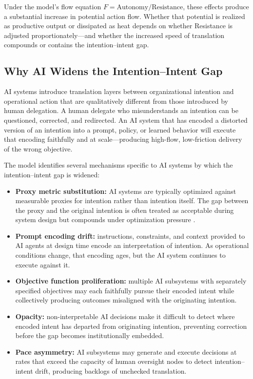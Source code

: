 \documentclass[12pt]{article}
\begin{document}
Under the model's flow equation $F = \text{Autonomy} / \text{Resistance}$,
these effects produce a substantial increase in potential action flow.
Whether that potential is realized as productive output or dissipated
as heat depends on whether Resistance is adjusted proportionately---and
whether the increased speed of translation compounds or contains the
intention--intent gap.

\subsection{Why AI Widens the Intention--Intent Gap}

AI systems introduce translation layers between organizational intention and
operational action that are qualitatively different from those introduced by
human delegation. A human delegate who misunderstands an intention can be
questioned, corrected, and redirected. An AI system that has encoded a
distorted version of an intention into a prompt, policy, or learned behavior
will execute that encoding faithfully and at scale---producing high-flow,
low-friction delivery of the wrong objective.

The model identifies several mechanisms specific to AI systems by which the
intention--intent gap is widened:

\begin{itemize}
  \item \textbf{Proxy metric substitution:} AI systems are typically
    optimized against measurable proxies for intention rather than intention
    itself. The gap between the proxy and the original intention is often
    treated as acceptable during system design but compounds under
    optimization pressure \citep{russell2019human}.
  \item \textbf{Prompt encoding drift:} instructions, constraints, and
    context provided to AI agents at design time encode an interpretation of
    intention. As operational conditions change, that encoding ages, but
    the AI system continues to execute against it.
  \item \textbf{Objective function proliferation:} multiple AI subsystems
    with separately specified objectives may each faithfully pursue their
    encoded intent while collectively producing outcomes misaligned with the
    originating intention.
  \item \textbf{Opacity:} non-interpretable AI decisions make it difficult
    to detect where encoded intent has departed from originating intention,
    preventing correction before the gap becomes institutionally embedded.
  \item \textbf{Pace asymmetry:} AI subsystems may generate and execute
    decisions at rates that exceed the capacity of human oversight nodes
    to detect intention--intent drift, producing backlogs of unchecked
    translation.
\end{itemize}
\end{document}
